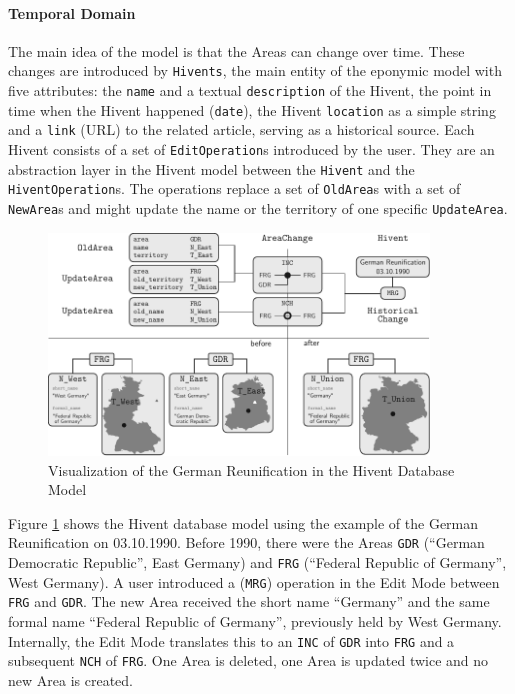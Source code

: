 
\paragraph{Temporal Domain} %
\label{par:temporal_domain}

The main idea of the model is that the Areas can change over time. These changes are introduced by \texttt{Hivents}, the main entity of the eponymic model with five attributes: the \texttt{name} and a textual \texttt{description} of the Hivent, the point in time when the Hivent happened (\texttt{date}), the Hivent \texttt{location} as a simple string and a \texttt{link} (URL) to the related article, serving as a historical source.
Each Hivent consists of a set of \texttt{EditOperation}s introduced by the user.
They are an abstraction layer in the Hivent model between the \texttt{Hivent} and the \texttt{HiventOperation}s.
The operations replace a set of \texttt{OldArea}s with a set of \texttt{NewArea}s and might update the name or the territory of one specific \texttt{UpdateArea}.



\begin{figure}[ht]
  \vspace{1.5em}
  \includegraphics[width=0.9\textwidth]{graphics/development/implementation/example_reunification}
  \caption{Visualization of the German Reunification in the Hivent Database Model}
  \label{fig:database_example_reunification}
\end{figure}

\newpage
Figure \ref{fig:database_example_reunification} shows the Hivent database model using the example of the German Reunification on 03.10.1990. Before 1990, there were the Areas \texttt{GDR} (``German Democratic Republic'', East Germany) and \texttt{FRG} (``Federal Republic of Germany'', West Germany). A user introduced a (\texttt{MRG}) operation in the Edit Mode between \texttt{FRG} and \texttt{GDR}. The new Area received the short name ``Germany'' and the same formal name ``Federal Republic of Germany'', previously held by West Germany. Internally, the Edit Mode translates this to an \texttt{INC} of \texttt{GDR} into \texttt{FRG} and a subsequent \texttt{NCH} of \texttt{FRG}. One Area is deleted, one Area is updated twice and no new Area is created.

